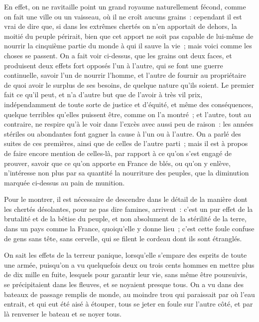 \documentclass[french,twoside]{book} %
\begin{document}
En effet, on ne ravitaille point un grand royaume naturellement fécond, comme on fait une ville ou un vaisseau, où il ne croît aucuns grains : cependant il est vrai de dire que, si dans les extrêmes chertés on n’en apportait de dehors, la moitié du peuple périrait, bien que cet apport ne soit pas capable de lui-même de nourrir la cinquième partie du monde à qui il sauve la vie ; mais voici comme les choses se passent. On a fait voir ci-dessus, que les grains ont deux faces, et produisent deux effets fort opposés l’un à l’autre, qui se font une guerre continuelle, savoir l’un de nourrir l’homme, et l’autre de fournir au propriétaire de quoi avoir le surplus de ses besoins, de quelque nature qu’ils soient. Le premier fait ce qu’il peut, et n’a d’autre but que de l’avoir à très vil prix, indépendamment de toute sorte de justice et d’équité, et même des conséquences, quelque terribles qu’elles puissent être, comme on l’a montré ; et l’autre, tout au contraire, ne respire qu’à le voir dans l’excès avec aussi peu de raison : les années stériles ou abondantes font gagner la cause à l’un ou à l’autre. On a parlé des suites de ces premières, ainsi que de celles de l’autre parti ; mais il est à propos de faire encore mention de celles-là, par rapport à ce qu’on s’est engagé de prouver, savoir que ce qu’on apporte en France de blés, ou qu’on y enlève, n’intéresse non plus par sa quantité la nourriture des peuples, que la diminution marquée ci-dessus au pain de munition.\par
Pour le montrer, il est nécessaire de descendre dans le détail de la manière dont les chertés désolantes, pour ne pas dire famines, arrivent : c’est un pur effet de la brutalité et de la bêtise du peuple, et non absolument de la stérilité de la terre, dans un pays comme la France, quoiqu’elle y donne lieu ; c’est cette foule confuse de gens sans tête, sans cervelle, qui se filent le cordeau dont ils sont étranglés.\par
On sait les effets de la terreur panique, lorsqu’elle s’empare des esprits de toute une armée, puisqu’on a vu quelquefois deux ou trois cents hommes en mettre plus de dix mille en fuite, lesquels pour garantir leur vie, sans même être poursuivis, se précipitaient dans les fleuves, et se noyaient presque tous. On a vu dans des bateaux de passage remplis de monde, au moindre trou qui paraissait par où l’eau entrait, et qui eut été aisé à étouper, tous se jeter en foule sur l’autre côté, et par là renverser le bateau et se noyer tous.\par
\end{document}
